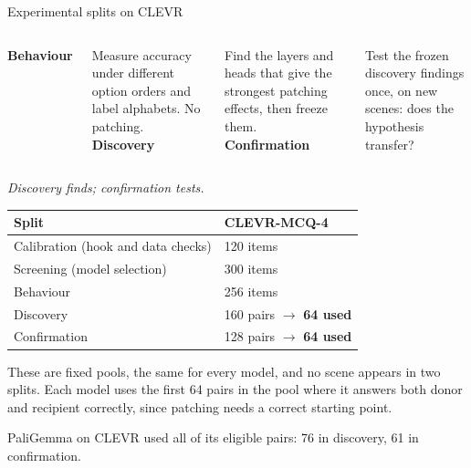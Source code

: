 \documentclass[aspectratio=169,12pt]{beamer}
\begin{document}
\begin{frame}{Experimental splits on CLEVR}
\centering
\begin{columns}[T,onlytextwidth]
\centering\scriptsize
\textbf{\normalsize Behaviour}\par\vspace{0.06cm}
Measure accuracy under different option orders and label alphabets. No patching.
\centering\scriptsize
\textbf{\normalsize Discovery}\par\vspace{0.06cm}
Find the layers and heads that give the strongest patching effects, then freeze them.
\centering\scriptsize
\textbf{\normalsize Confirmation}\par\vspace{0.06cm}
Test the frozen discovery findings once, on new scenes: does the hypothesis transfer?
\end{columns}

\vspace{0.10cm}
{\footnotesize\itshape Discovery finds; confirmation tests.}

\vspace{0.18cm}
\scriptsize
\renewcommand{\arraystretch}{1.08}
\begin{tabular}{@{}l l@{}}
\toprule
Split & CLEVR-MCQ-4 \\
\midrule
Calibration \textcolor{Slate}{(hook and data checks)} & 120 items \\
Screening \textcolor{Slate}{(model selection)} & 300 items \\
Behaviour & 256 items \\
Discovery & 160 pairs $\rightarrow$ \textbf{64 used} \\
Confirmation & 128 pairs $\rightarrow$ \textbf{64 used} \\
\bottomrule
\end{tabular}

\vspace{0.18cm}
\footnotesize
These are fixed pools, the same for every model, and no scene appears in two splits. Each model uses the first 64 pairs in the pool where it answers both donor and recipient correctly, since patching needs a correct starting point.\par
\vspace{0.04cm}
{\scriptsize\color{Slate}PaliGemma on CLEVR used all of its eligible pairs: 76 in discovery, 61 in confirmation.}
\end{frame}
\end{document}
